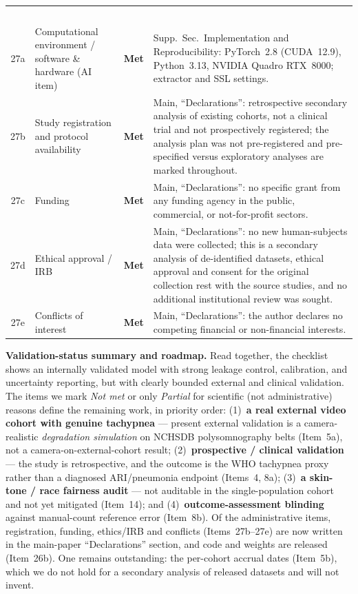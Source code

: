 \begin{table}[!tp]
\begin{tabular}{@{}c >{\raggedright\arraybackslash}p{1.65in} >{\raggedright\arraybackslash}p{0.70in} >{\raggedright\arraybackslash}p{3.35in}@{}}
$$\multicolumn{4}{@{}l}{\emph{Other information}}\\
27a & Computational environment / software \& hardware (AI item)
    & \textbf{Met}
    & Supp.~Sec.~Implementation and Reproducibility: PyTorch~2.8 (CUDA~12.9), Python~3.13, NVIDIA Quadro RTX~8000; extractor and SSL settings.\\
27b & Study registration and protocol availability
    & \textbf{Met}
    & Main, ``Declarations'': retrospective secondary analysis of existing cohorts, not a clinical
trial and not prospectively registered; the analysis plan was not pre-registered and
pre-specified versus exploratory analyses are marked throughout.\\
27c & Funding
    & \textbf{Met}
    & Main, ``Declarations'': no specific grant from any funding agency in the public, commercial,
or not-for-profit sectors.\\
27d & Ethical approval / IRB
    & \textbf{Met}
    & Main, ``Declarations'': no new human-subjects data were collected; this is a secondary
analysis of de-identified datasets, ethical approval and consent for the original collection
rest with the source studies, and no additional institutional review was sought.\\
27e & Conflicts of interest
    & \textbf{Met}
    & Main, ``Declarations'': the author declares no competing financial or non-financial
interests.\\
\bottomrule
\end{tabular}
\end{table}

\noindent\textbf{Validation-status summary and roadmap.} Read together, the checklist shows an internally
validated model with strong leakage control, calibration, and uncertainty reporting, but with clearly bounded
external and clinical validation. The items we mark \emph{Not met} or only \emph{Partial} for scientific
(not administrative) reasons define the remaining work, in priority order: (1)~\textbf{a real external video
cohort with genuine tachypnea} --- present external validation is a camera-realistic \emph{degradation
simulation} on NCHSDB polysomnography belts (Item~5a), not a camera-on-external-cohort result;
(2)~\textbf{prospective / clinical validation} --- the study is retrospective, and the outcome is the WHO
tachypnea proxy rather than a diagnosed ARI/pneumonia endpoint (Items~4, 8a);
(3)~\textbf{a skin-tone / race fairness audit} --- not auditable in the single-population cohort and not yet
mitigated (Item~14); and (4)~\textbf{outcome-assessment blinding} against manual-count reference error
(Item~8b). Of the administrative items, registration, funding, ethics/IRB and conflicts
(Items~27b--27e) are now written in the main-paper ``Declarations'' section, and code and weights
are released (Item~26b). One remains outstanding: the per-cohort accrual dates (Item~5b), which
we do not hold for a secondary analysis of released datasets and will not invent.

